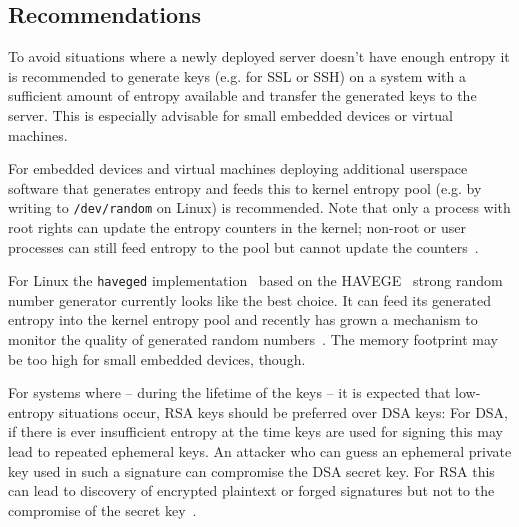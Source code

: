 \subsection{Recommendations}

To avoid situations where a newly deployed server doesn't have enough
entropy it is recommended to generate keys (e.g. for SSL or SSH) on
a system with a sufficient amount of entropy available and transfer the generated keys
to the server.  This is especially advisable for small embedded devices
or virtual machines.

For embedded devices and virtual machines deploying additional userspace
software that generates entropy and feeds this to kernel entropy pool
(e.g. by writing to \verb+/dev/random+ on Linux) is recommended. Note
that only a process with root rights can update the entropy counters in the
kernel; non-root or user processes can still feed entropy to the pool but
cannot update the counters~\cite{Wikipedia:/dev/random}.

For Linux the \verb+haveged+
implementation~\cite{HAV13a} based on the HAVEGE~\cite{SS03}
strong random number generator currently looks like the best choice. It
can feed its generated entropy into the kernel entropy pool and recently
has grown a mechanism to monitor the quality of generated random
numbers~\cite{HAV13b}. The memory footprint may be too high for small
embedded devices, though.

For systems where -- during the lifetime of the keys -- it is expected
that low-entropy situations occur, RSA keys should be preferred over DSA
keys: For DSA, if there is ever insufficient entropy at the time keys
are used for signing this may lead to repeated ephemeral keys. An
attacker who can guess an ephemeral private key used in such a signature
can compromise the DSA secret key.
For RSA this can lead to discovery of encrypted plaintext or forged
signatures but not to the compromise of the secret key~\cite{HDWH12}.

